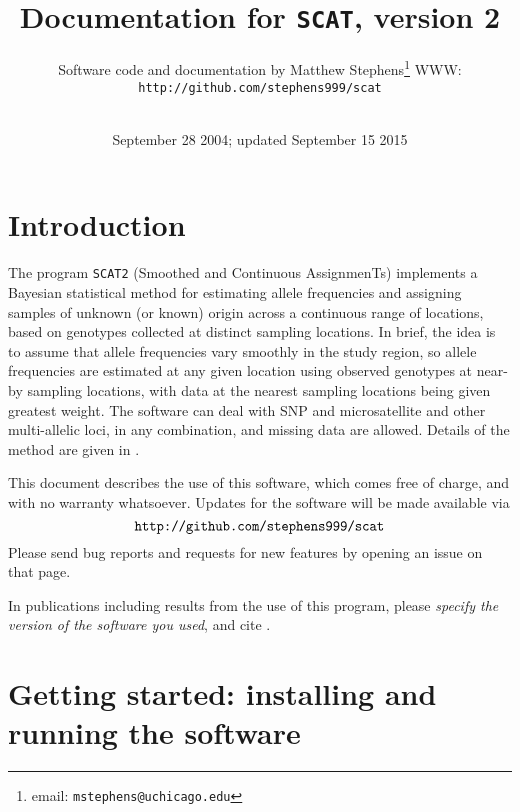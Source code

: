 \documentclass[11pt,titlepage,times,letterpaper]{article}
\def\SCAT{{\tt SCAT2} }
\begin{document}
\title{Documentation for {\tt SCAT}, version 2}

\author{
Software code and documentation by Matthew Stephens\footnote{email: {\tt mstephens@uchicago.edu}}
WWW: {\tt http://github.com/stephens999/scat}\\
\\
}

\date{September 28 2004; updated September 15 2015}

\maketitle

\tableofcontents
\vfil\eject
\section{Introduction}

The program \SCAT (Smoothed and Continuous AssignmenTs)
implements a Bayesian statistical method for estimating allele
frequencies and assigning samples of unknown (or known) origin across
a continuous range of locations, based on genotypes collected at
distinct sampling locations.  In brief, the idea is to assume that allele
frequencies vary smoothly in the study region, so allele frequencies
are estimated at any given location using observed genotypes at
near-by sampling locations, with data at the nearest sampling
locations being given greatest weight.  The software can deal with SNP
and microsatellite and other multi-allelic loci, in any combination,
and missing data are allowed. Details of the method are given in
\cite{wasser.etal.04}.

This document describes the use of this software, which comes free of
charge, and with no warranty whatsoever.  Updates for the software
will be made available via
$$\text{{\tt http://github.com/stephens999/scat}}$$
Please send bug reports and requests for new features by opening an issue on that page.

In publications including results from the use of this program, please
{\it specify the version of the software you used}, and cite
\cite{wasser.etal.04}.




\section{Getting started: installing and running the software}
\label{started}
\end{document}
